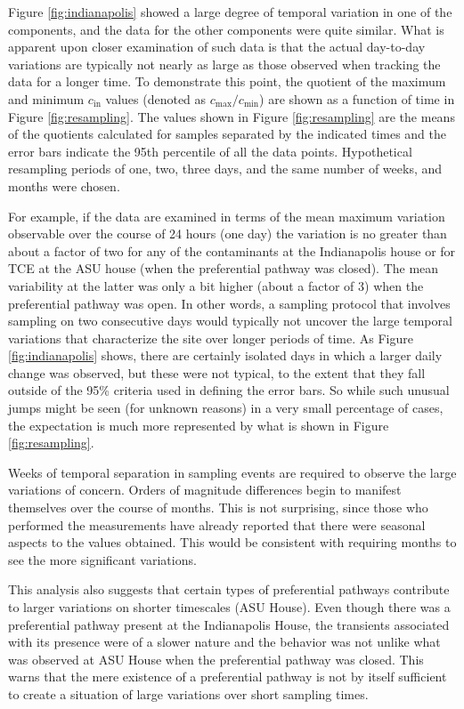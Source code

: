 \documentclass[journal=esthag,manuscript=article]{achemso}
\begin{document}
Figure \ref{fig:indianapolis} showed a large degree of temporal variation in one of the components, and the data for the other components were quite similar.
What is apparent upon closer examination of such data is that the actual day-to-day variations are typically not nearly as large as those observed when tracking the data for a longer time.
To demonstrate this point, the quotient of the maximum and minimum $c_\mathrm{in}$ values (denoted as $c_\mathrm{max}/c_\mathrm{min}$) are shown as a function of time in Figure \ref{fig:resampling}.
The values shown in Figure \ref{fig:resampling} are the means of the quotients calculated for samples separated by the indicated times and the error bars indicate the 95th percentile of all the data points.
Hypothetical resampling periods of one, two, three days, and the same number of weeks, and months were chosen.

For example, if the data are examined in terms of the mean maximum variation observable over the course of 24 hours (one day) the variation is no greater than about a factor of two for any of the contaminants at the Indianapolis house or for TCE at the ASU house (when the preferential pathway was closed).
The mean variability at the latter was only a bit higher (about a factor of 3) when the preferential pathway was open.
In other words, a sampling protocol that involves sampling on two consecutive days would typically not uncover the large temporal variations that characterize the site over longer periods of time.
As Figure \ref{fig:indianapolis} shows, there are certainly isolated days in which a larger daily change was observed, but these were not typical, to the extent that they fall outside of the 95\% criteria used in defining the error bars.
So while such unusual jumps might be seen (for unknown reasons) in a very small percentage of cases, the expectation is much more represented by what is shown in Figure \ref{fig:resampling}.

Weeks of temporal separation in sampling events are required to observe the large variations of concern.
Orders of magnitude differences begin to manifest themselves over the course of months.
This is not surprising, since those who performed the measurements have already reported that there were seasonal aspects to the values obtained.
This would be consistent with requiring months to see the more significant variations.

This analysis also suggests that certain types of preferential pathways contribute to larger variations on shorter timescales (ASU House).
Even though there was a preferential pathway present at the Indianapolis House, the transients associated with its presence were of a slower nature and the behavior was not unlike what was observed at ASU House when the preferential pathway was closed.
This warns that the mere existence of a preferential pathway is not by itself sufficient to create a situation of large variations over short sampling times.
\end{document}
